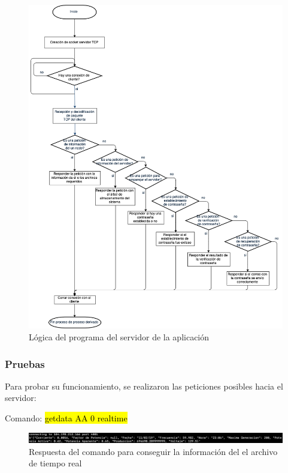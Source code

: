 \begin{figure}[H]
	\centering
	\includegraphics[scale=.4]{Capitulo5/images/logica_server_tcp.png}
	\caption{Lógica del programa del servidor de la aplicación}
	\label{fig:programa del servidor aplicacion}
\end{figure} 

\subsubsection{Pruebas}

Para probar su funcionamiento, se realizaron las peticiones posibles hacia el servidor:

Comando: \hl{getdata AA 0 realtime}
\begin{figure}[H]
	\centering
	\includegraphics[scale=.3]{Capitulo5/images/get_data.png}
	\caption{Respuesta del comando para conseguir la información del el archivo de tiempo real}
	\label{fig:}
\end{figure} 

